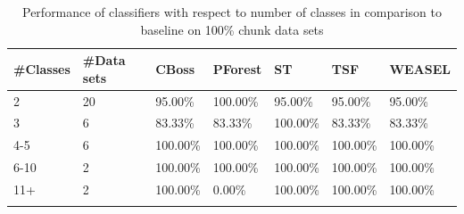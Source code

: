 \begin{table}[!htb]
	\setlength\extrarowheight{2pt} %
	\begin{tabularx}{\textwidth}{|X|X|X|X|X|X|X|}
	\hline
	\textbf{\#Classes} & \textbf{\#Data sets} & \textbf{CBoss} & \textbf{PForest} & \textbf{ST} & \textbf{TSF} & \textbf{WEASEL} \\ \hline
		2 & 20 & 95.00\% & 100.00\% & 95.00\% & 95.00\% & 95.00\% \\ \hline
		3 & 6 & 83.33\% & 83.33\% & 100.00\% & 83.33\% & 83.33\% \\ \hline
		4-5 & 6 & 100.00\% & 100.00\% & 100.00\% & 100.00\% & 100.00\% \\ \hline
		6-10 & 2 & 100.00\% & 100.00\% & 100.00\% & 100.00\% & 100.00\% \\ \hline
		11+ & 2 & 100.00\% & 0.00\% & 100.00\% & 100.00\% & 100.00\% \\ \hline
  \caption{Performance of classifiers with respect to number of classes in comparison to baseline on 100\% chunk data sets}
  \end{tabularx}
\end{table}

